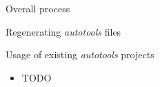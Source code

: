 \begin{frame}{Overall process}

\end{frame}

\begin{frame}{Regenerating {\em autotools} files}

\end{frame}

\setuplabframe
{Usage of existing {\em autotools} projects}
{
  \begin{itemize}
  \item TODO
  \end{itemize}
}
